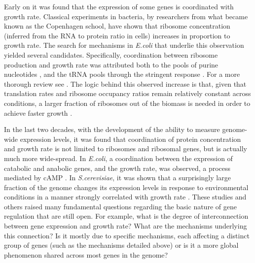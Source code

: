 \documentclass[notitlepage]{article}
\begin{document}
Early on it was found that the expression of some genes is coordinated with growth rate.
Classical experiments in bacteria, by researchers from what became known as the Copenhagen school, have shown that ribosome concentration (inferred from the RNA to protein ratio in cells) increases in proportion to growth rate\parencite{Schaechter1958}.
The search for mechanisms in \emph{E.coli} that underlie this observation yielded several candidates.
Specifically, coordination between ribosome production and growth rate was attributed both to the pools of purine nucleotides \parencite{Gourse1996,Gaal1997}, and the tRNA pools through the stringent response \parencite{Chatterji2001,Brauer2008a}.
For a more thorough review see \parencite{Nomura1984}.
The logic behind this observed increase is that, given that translation rates and ribosome occupancy ratios remain relatively constant across conditions, a larger fraction of ribosomes out of the biomass is needed in order to achieve faster growth \parencite{neidhardt1999a,dennis2004,zaslaver2009a,}.

In the last two decades, with the development of the ability to measure genome-wide expression levels, it was found that coordination of protein concentration and growth rate is not limited to ribosomes and ribosomal genes, but is actually much more wide-spread.
In \emph{E.coli}, a coordination between the expression of catabolic and anabolic genes, and the growth rate, was observed, a process mediated by cAMP \parencite{Saldanha2004}.
In \emph{S.cerevisiae}, it was shown that a surprisingly large fraction of the genome changes its expression levels in response to environmental conditions in a manner strongly correlated with growth rate \parencite{Keren2013a,Gasch2000,Castrillo2007, Zaslaver2009a, Berthoumieux2013, Gerosa2013}.
These studies and others raised many fundamental questions regarding the basic nature of gene regulation that are still open.
For example, what is the degree of interconnection between gene expression and growth rate? What are the mechanisms underlying this connection? Is it mostly due to specific mechanisms, each affecting a distinct group of genes (such as the mechanisms detailed above) or is it a more global phenomenon shared across most genes in the genome?
\end{document}

